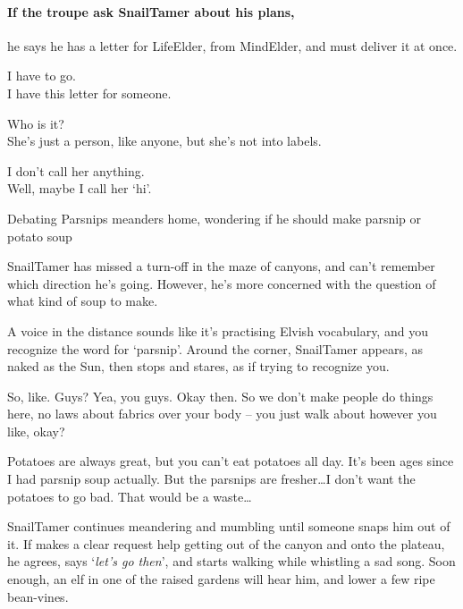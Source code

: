 \paragraph{If the troupe ask \gls{SnailTamer} about his plans,}
he says he has a letter for \gls{LifeElder}, from \gls{MindElder}, and must deliver it at once.

\begin{speechtext}
  I have to go. \\
  I have this letter for someone.

  Who is it? \\
  She's just a person, like anyone, but she's not into labels.

  I don't call her anything. \\
  Well, maybe I call her `hi'.
\end{speechtext}

{Debating Parsnips}%
{ meanders home, wondering if he should make parsnip or potato soup}%

\Gls{SnailTamer} has missed a turn-off in the maze of canyons, and can't remember which direction he's going.
However, he's more concerned with the question of what kind of soup to make.

\begin{boxtext}
A voice in the distance sounds like it's practising Elvish vocabulary, and you recognize the word for `parsnip'.
Around the corner, \gls{SnailTamer} appears, as naked as the Sun, then stops and stares, as if trying to recognize you.
\end{boxtext}

\begin{speechtext}
  So, like.  Guys?  Yea, you guys.  Okay then.  So we don't make people do things here, no laws about fabrics over your body -- you just walk about however you like, okay?

  Potatoes are always great, but you can't eat potatoes all day.
  It's been ages since I had parsnip soup actually.
  But the parsnips are fresher\ldots I don't want the potatoes to go bad.
  That would be a waste\ldots
\end{speechtext}

\Gls{SnailTamer} continues meandering and mumbling until someone snaps him out of it.
If  makes a clear request help getting out of the canyon and onto the plateau, he agrees, says `\textit{let's go then}', and starts walking while whistling a sad song.
Soon enough, an elf in one of the raised gardens will hear him, and lower a few ripe bean-vines.

